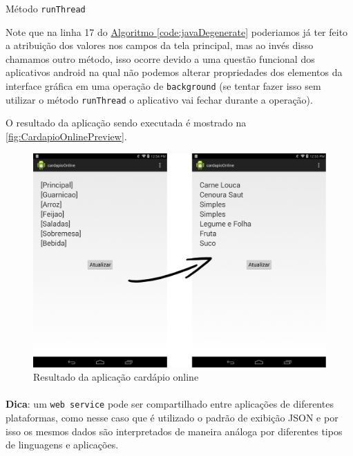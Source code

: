 \documentclass[a4paper,12pt,brazil,oneside]{book}
\begin{document}
\begin{listing}[H]
	\inputminted[linenos=true,fontsize=\small,frame=lines, framesep=2mm, tabsize=2,numbersep=5pt]{xml}{src/devapp/cardapio/runThread.java}
	\caption{Método \texttt{runThread}}
	\label{code:javaRunThread}
	\end{listing}
	
Note que na linha 17 do \hyperref[code:javaDegenerate]{Algoritmo \ref*{code:javaDegenerate}} poderiamos já ter feito a atribuição dos valores nos campos da tela principal, mas ao invés disso chamamos outro método, isso ocorre devido a uma questão funcional dos aplicativos android na qual não podemos alterar propriedades dos elementos da interface gráfica em uma operação de \texttt{background} (se tentar fazer isso sem utilizar o método \texttt{runThread} o aplicativo vai fechar durante a operação).

O resultado da aplicação sendo executada é mostrado na \autoref{fig:CardapioOnlinePreview}.

\begin{figure}[H]
  \centering
  \includegraphics[width=.75\textwidth]{figuras/devapp/cardapio/appPreview.png}
  \caption{Resultado da aplicação cardápio online}
  \label{fig:CardapioOnlinePreview}
\end{figure}

\begin{framed}
\paragraph{}\textbf{Dica}: um \texttt{web service} pode ser compartilhado entre aplicações de diferentes plataformas, como nesse caso que é utilizado o padrão de exibição JSON e por isso os mesmos dados são interpretados de maneira análoga por diferentes tipos de linguagens e aplicações.
\end{framed}
\end{document}
